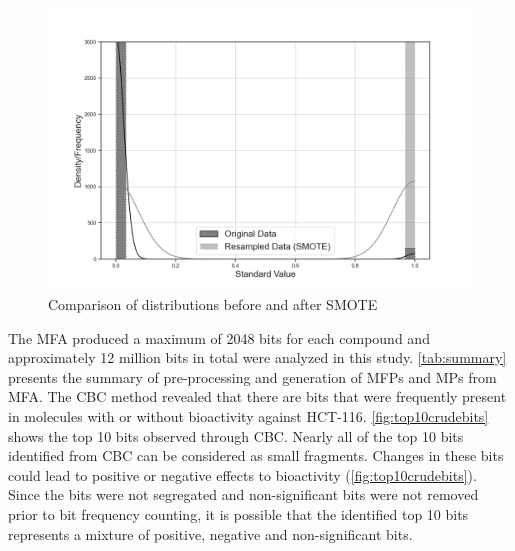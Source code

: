 \FloatBarrier
\begin{figure}[h]
	\centering
	\begin{minipage}{\textwidth}
		\centering
		\includegraphics[width=1\textwidth]{SMOTEbw.png}
		\vspace{-1cm}
		\caption{Comparison of distributions before and after SMOTE}
		\label{fig:SMOTE}
	\end{minipage}
\end{figure}
\FloatBarrier


The MFA produced a maximum of 2048 bits for each compound and approximately 12 million bits in total were analyzed in this study. \autoref{tab:summary} presents the summary of pre-processing and generation of MFPs and MPs from MFA. The CBC method revealed that there are bits that were frequently present in molecules with or without bioactivity against HCT-116. \autoref{fig:top10crudebits} shows the top 10 bits observed through CBC. Nearly all of the top 10 bits identified from CBC can be considered as small fragments. Changes in these bits could lead to positive or negative effects to bioactivity (\autoref{fig:top10crudebits}). Since the bits were not segregated and non-significant bits were not removed prior to bit frequency counting, it is possible that the identified top 10 bits represents a mixture of positive, negative and non-significant bits. 


